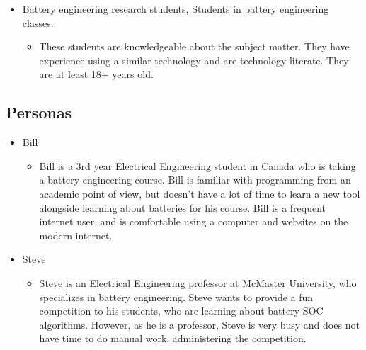 \documentclass[12pt]{article}
\begin{document}
\begin{itemize}
    \item Battery engineering research students, Students in battery engineering classes.
    \begin{itemize}
        \item These students are knowledgeable about the subject matter. They have experience using a similar technology and are technology literate. They are at least 18+ years old.
    \end{itemize}
\end{itemize}

\subsection{Personas}

\begin{itemize}
    \item Bill
    \begin{itemize}
        \item Bill is a 3rd year Electrical Engineering student in Canada who is taking a battery engineering course. Bill is familiar with programming from an academic point of view, but doesn’t have a lot of time to learn a new tool alongside learning about batteries for his course. Bill is a frequent internet user, and is comfortable using a computer and websites on the modern internet.
    \end{itemize}
    \item Steve
    \begin{itemize}
        \item Steve is an Electrical Engineering professor at McMaster University, who specializes in battery engineering. Steve wants to provide a fun competition to his students, who are learning about battery SOC algorithms. However, as he is a professor, Steve is very busy and does not have time to do manual work, administering the competition.
    \end{itemize}
\end{itemize}
\end{document}
